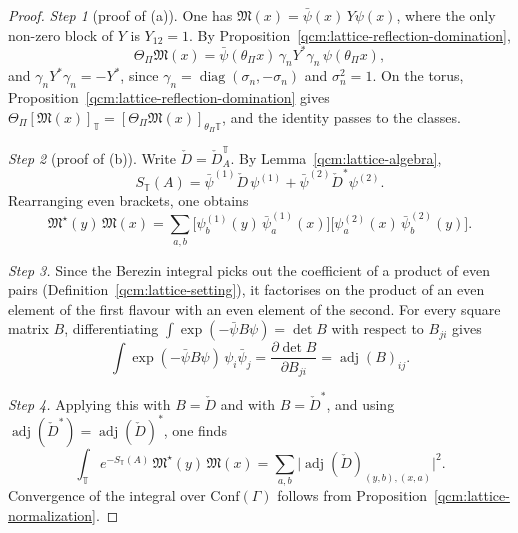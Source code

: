 \documentclass[11pt,letterpaper,reqno]{amsart}
\theoremstyle{definition}
\begin{document}
\begin{proof}
\emph{Step 1} (proof of (a)).
One has $\mathfrak M(x)=\bar\psi(x)\,Y\psi(x)$, where the only non-zero block of $Y$ is $Y_{12}=1$.
By Proposition~\ref{qcm:lattice-reflection-domination},
\begin{equation*}
\Theta_\Pi\mathfrak M(x)=\bar\psi(\theta_\Pi x)\,\gamma_nY^*\gamma_n\,\psi(\theta_\Pi x),
\end{equation*}
and $\gamma_nY^*\gamma_n=-Y^*$, since $\gamma_n=\operatorname{diag}(\sigma_n,-\sigma_n)$ and $\sigma_n^2=1$.
On the torus, Proposition~\ref{qcm:lattice-reflection-domination} gives $\Theta_\Pi[\mathfrak M(x)]_{\mathbb T}=\allowbreak [\Theta_\Pi\mathfrak M(x)]_{\theta_\Pi\mathbb T}$, and the identity passes to the classes.

\emph{Step 2} (proof of (b)).
Write $\check D=\check D^{\mathbb T}_A$.
By Lemma~\ref{qcm:lattice-algebra},
\begin{equation*}
S_{\mathbb T}(A)=\bar\psi^{(1)}\check D\,\psi^{(1)}+\bar\psi^{(2)}\check D^{*}\psi^{(2)}.
\end{equation*}
Rearranging even brackets, one obtains
\begin{equation*}
\mathfrak M^\star(y)\,\mathfrak M(x)=\sum_{a,b}\bigl[\psi^{(1)}_b(y)\,\bar\psi^{(1)}_a(x)\bigr]\bigl[\psi^{(2)}_a(x)\,\bar\psi^{(2)}_b(y)\bigr].
\end{equation*}

\emph{Step 3.}
Since the Berezin integral picks out the coefficient of a product of even pairs (Definition~\ref{qcm:lattice-setting}), it factorises on the product of an even element of the first flavour with an even element of the second.
For every square matrix $B$, differentiating $\int\exp(-\bar\psi B\psi)=\det B$ with respect to $B_{ji}$ gives
\begin{equation*}
\int\exp(-\bar\psi B\psi)\,\psi_i\bar\psi_j=\frac{\partial\det B}{\partial B_{ji}}=\operatorname{adj}(B)_{ij}.
\end{equation*}

\emph{Step 4.}
Applying this with $B=\check D$ and with $B=\check D^*$, and using $\operatorname{adj}(\check D^*)=\operatorname{adj}(\check D)^*$, one finds
\begin{equation*}
\int_{\mathbb T}e^{-S_{\mathbb T}(A)}\,\mathfrak M^\star(y)\,\mathfrak M(x)=\sum_{a,b}\bigl|\operatorname{adj}(\check D)_{(y,b),(x,a)}\bigr|^2.
\end{equation*}
Convergence of the integral over $\mathrm{Conf}(\Gamma)$ follows from Proposition~\ref{qcm:lattice-normalization}.


\end{proof}
\end{document}
